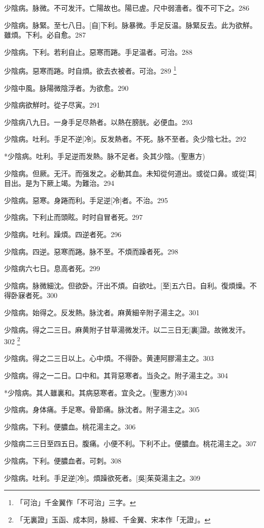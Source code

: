 \documentclass[12pt,twoside,UTF8,b5paper]{ctexbook}
\begin{document}
少陰病。脉微。不可发汗。亡陽故也。陽已虗。尺中弱濇者。復不可下之。286

少陰病。脉緊。至七八日。[自]下利。脉暴微。手足反温。脉緊反去。此为欲觧。雖煩。下利。必自愈。287

少陰病。下利。若利自止。惡寒而踡。手足温者。可治。288

少陰病。惡寒而踡。时自煩。欲去衣被者。可治。289
	\footnote{「可治」千金翼作「不可治」三字。}

少陰中風。脉陽微陰浮者。为欲愈。290

少陰病欲觧时。從子尽寅。291

少陰病八九日。一身手足尽熱者。以熱在膀胱。必便血。293

少陰病。吐利。手足不逆[冷]。反发熱者。不死。脉不至者。灸少陰七壯。292

*少陰病。吐利。手足逆而发熱。脉不足者。灸其少陰。(聖惠方)

少陰病。但厥。无汗。而强发之。必動其血。未知從何道出。或從口鼻。或從[耳]目出。是为下厥上竭。为難治。294

少陰病。惡寒。身踡而利。手足逆[冷]者。不治。295

少陰病。下利止而頭眩。时时自冒者死。297

少陰病。吐利。躁煩。四逆者死。296

少陰病。四逆。惡寒而踡。脉不至。不煩而躁者死。298

少陰病六七日。息高者死。299

少陰病。脉微細沈。但欲卧。汗出不煩。自欲吐。[至]五六日。自利。復煩燥。不得卧寐者死。300

少陰病。始得之。反发熱。脉沈者。麻黄細辛附子湯主之。301

少陰病。得之二三日。麻黄附子甘草湯微发汗。以二三日无[裏]證。故微发汗。302
	\footnote{「无裏證」玉函、成本同，脉經、千金翼、宋本作「无證」。}

少陰病。得之二三日以上。心中煩。不得卧。黄連阿膠湯主之。303

少陰病。得之一二日。口中和。其背惡寒者。当灸之。附子湯主之。304

*少陰病。其人雖裏和。其病惡寒者。宜灸之。(聖惠方)304

少陰病。身体痛。手足寒。骨節痛。脉沈者。附子湯主之。305

少陰病。下利。便膿血。桃花湯主之。306

少陰病二三日至四五日。腹痛。小便不利。下利不止。便膿血。桃花湯主之。307

少陰病。下利。便膿血者。可刺。308

少陰病。吐利。手足逆[冷]。煩躁欲死者。[吳]茱萸湯主之。309
\end{document}
